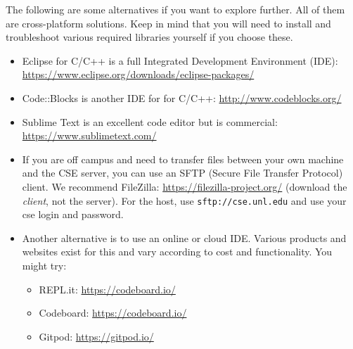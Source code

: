 \documentclass[12pt]{scrartcl}
\begin{document}
The following are some alternatives if you want to explore further.
All of them are cross-platform solutions.  Keep in mind that you will
need to install and troubleshoot various required libraries yourself if
you choose these.
\begin{itemize} 
  \item Eclipse for C/C++ is a full Integrated Development Environment (IDE):
  \url{https://www.eclipse.org/downloads/eclipse-packages/}
  \item Code::Blocks is another IDE for for C/C++: \url{http://www.codeblocks.org/}
  \item Sublime Text is an excellent code editor but is commercial: \url{https://www.sublimetext.com/}
  \item If you are off campus and need to transfer files between your 
  own machine and the CSE server, you can use an SFTP (Secure File Transfer
  Protocol) client.  We recommend FileZilla: \url{https://filezilla-project.org/}
  (download the \emph{client}, not the server).  For the host, use 
  \texttt{sftp://cse.unl.edu} and use your cse login and password.
  \item Another alternative is to use an online or cloud IDE.  Various products
  and websites exist for this and vary according to cost and functionality.
  You might try: 
  \begin{itemize}
    \item REPL.it: \url{https://codeboard.io/}
    \item Codeboard: \url{https://codeboard.io/}
    \item Gitpod: \url{https://gitpod.io/}
  \end{itemize}
\end{itemize}


  
\end{document}
